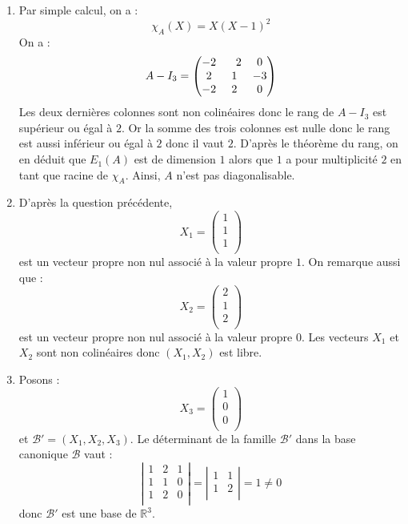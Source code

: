 \documentclass[a4paper,10pt]{report}
\begin{document}
\corr

\begin{enumerate}
\item Par simple calcul, on a :
$$ \chi_A(X)=X(X-1)^2$$
On a :
$$ A-I_3 = \begin{pmatrix} -2 &\phantom-2 & 0 \cr 2 &1 &-3 \cr -2 &2 &0 \cr \end{pmatrix}$$
Les deux dernières colonnes sont non colinéaires donc le rang de $A-I_3$ est supérieur ou égal à $2$. Or la somme des trois colonnes est nulle donc le rang est aussi inférieur ou égal à $2$ donc il vaut $2$. D'après le théorème du rang, on en déduit que $E_1(A)$ est de dimension $1$ alors que $1$ a pour multiplicité $2$ en tant que racine de $\chi_A$. Ainsi, $A$ n'est pas diagonalisable.
\item D'après la question précédente, 
$$ X_1 = \begin{pmatrix}
1 \\
1 \\
1 \\
\end{pmatrix}$$ 
est un vecteur propre non nul associé à la valeur propre $1$.
On remarque aussi que :
$$ X_2 = \begin{pmatrix}
2 \\
1 \\
2 \\
\end{pmatrix}$$ 
est un vecteur propre non nul associé à la valeur propre $0$. Les vecteurs $X_1$ et $X_2$ sont non colinéaires donc $(X_1,X_2)$ est libre.
\item Posons :
$$ X_3 = \begin{pmatrix}
1 \\
0 \\
0  \\
\end{pmatrix}$$
et $\mathcal{B}'=(X_1,X_2,X_3)$. Le déterminant de la famille $\mathcal{B}'$ dans la base canonique $\mathcal{B}$ vaut :
$$ \left\vert \begin{array}{ccc}
1 & 2 & 1 \\
1 & 1 & 0 \\
1 & 2 & 0 \\
\end{array}\right\vert = \left\vert \begin{array}{cc}
1 & 1 \\
1 & 2 \\
\end{array}\right\vert =  1 \neq 0$$
donc $\mathcal{B}'$ est une base de $\mathbb{R}^3$.

\end{enumerate}
\end{document}
